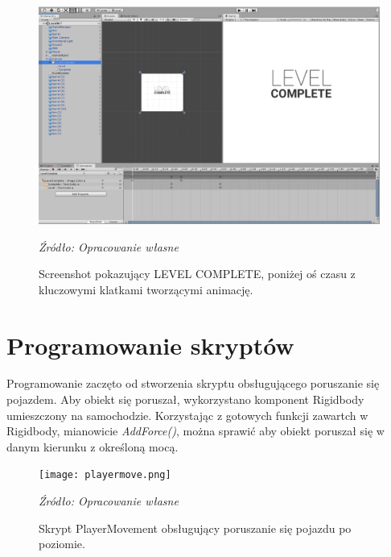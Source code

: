 \begin{figure}[!h]
\centering
  \includegraphics[width=0.75\linewidth]{levelcomplete2.png}
  \caption{Screenshot pokazujący LEVEL COMPLETE, poniżej oś czasu z kluczowymi klatkami tworzącymi animację.}\label{rys_3}
  \begin{minipage}[t]{0.75\linewidth}
    \emph{Źródło: Opracowanie własne}
  \end{minipage}
\end{figure}


\section{Programowanie skryptów}
\indent Programowanie zaczęto od stworzenia skryptu obsługującego poruszanie się pojazdem. Aby obiekt się poruszał, wykorzystano komponent Rigidbody umieszczony na samochodzie. Korzystając z gotowych funkcji zawartch w Rigidbody, mianowicie \textit{AddForce()}, można sprawić aby obiekt poruszał się w danym kierunku z określoną mocą.

\begin{figure}[!h]
\centering
  \texttt{[image: playermove.png]}
  \caption{Skrypt PlayerMovement obsługujący poruszanie się pojazdu po poziomie.}\label{rys_4}
  \begin{minipage}[t]{0.75\linewidth}
    \emph{Źródło: Opracowanie własne}
  \end{minipage}
\end{figure}

